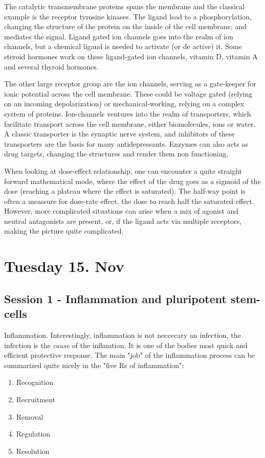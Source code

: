\documentclass[12p]{article}
\begin{document}
The catalytic transmembrane proteins spans the membrane and the classical example is the receptor tyrosine kinases.
The ligand lead to a phosphorylation, changing the structure of the protein on the inside of the cell membrane, and mediates the signal.
Ligand gated ion channels goes into the realm of ion channels, but a chemical ligand is needed to activate (or de active) it.
Some steroid hormones work on these ligand-gated ion channels, vitamin D, vitamin A and several thyroid hormones.

The other large receptor group are the ion channels, serving as a gate-keeper for ionic potential  across the cell membrane.
These could be voltage gated (relying on an incoming depolarization) or mechanical-working, relying on a complex system of proteins.
Ion-channels ventures into the realm of transporters, which facilitate transport across the cell membrane, either biomolecules, ions or water.
A classic transporter is the synaptic nerve system, and inhibitors of these transporters are the basis for many antidepressants.
Enzymes can also acts as drug targets, changing the structures and render them non functioning.

When looking at dose-effect relationship, one can encounter a quite straight forward mathematical mode, where the effect of the drug goes as a sigmoid of the dose (reaching a plateau where the effect is saturated).
The half-way point is often a meassure for dose-rate effect, the dose to reach half the saturated effect.
However, more complicated situations can arise when a mix of agonist and neutral antagonists are present, or, if the ligand acts via multiple receptors, making the picture quite complicated.

\section*{Tuesday 15. Nov}

\subsection*{Session 1 - Inflammation and pluripotent stem-cells}

Inflammation. 
Interestingly, inflammation is not neccecary an infection, the infection is the \emph{cause} of the inflamtion.
It is one of the bodies most quick and efficient protective response.
The main "job" of the inflammation process can be summarized quite nicely in the "five Rs of inflammation":

\begin{enumerate}
    \item
	Recognition 
    \item
	Recruitment 
    \item
	Removal
    \item
	Regulation
    \item
	Resolution
\end{enumerate}
\end{document}
